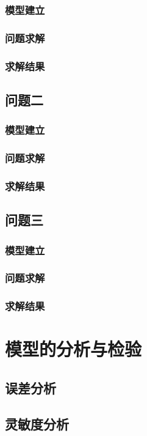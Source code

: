 \documentclass[withoutpreface,bwprint]{cumcmthesis} %
\begin{document}
\subsubsection{模型建立}
\subsubsection{问题求解}
\subsubsection{求解结果}

\subsection{问题二}
\subsubsection{模型建立}
\subsubsection{问题求解}
\subsubsection{求解结果}

\subsection{问题三}
\subsubsection{模型建立}
\subsubsection{问题求解}
\subsubsection{求解结果}

\section{模型的分析与检验}
\subsection{误差分析}
\subsection{灵敏度分析}
\end{document}
